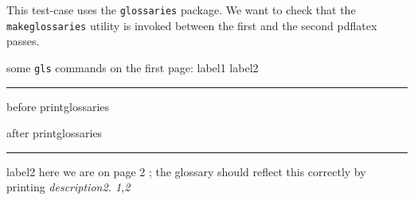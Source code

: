 \documentclass{article}
\begin{document}
This test-case uses the \texttt{glossaries}  package. We want to check
that the \texttt{makeglossaries} utility  is invoked between the first
and the second pdflatex passes.

some \texttt{gls} commands on the first page: 
\gls{label1}
\gls{label2}

\bigskip

\hrule
before printglossaries

\printglossaries

after printglossaries
\hrule

\clearpage
\gls{label2} here we are on page 2 ; the glossary should reflect this correctly by printing \emph{description2. 1,2}
\end{document}
